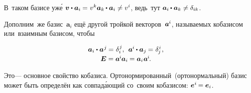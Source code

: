 \begin{otherlanguage}{russian}

\vspace{-0.16em}
В~таком базисе уж\'{е} ${\bm{v} \dotp \bm{a}_i \hspace{-0.1ex} = \hspace{.1ex} v^{k} \bm{a}_k \hspace{-0.1ex} \dotp \bm{a}_i \neq\vspace{.2ex} v^{i}}$\hspace{-0.25ex}, ведь~тут ${\bm{a}_i \hspace{-0.1ex} \dotp \bm{a}_k \neq\vspace{.2ex} \delta_{ik}}$.

Дополним~же \hbox{базис}~${\bm{a}_i}$ ещё другой тройкой векторов~\hbox{${\bm{a}^{\hspace{-0.05ex}i}}$\hspace{-0.25ex},} \hbox{называемых} кобазисом или~взаимным базисом, чтобы

\nopagebreak\vspace{-0.3em}\begin{equation}\label{fundamentalpropertyofcobasis}
\begin{array}{c}
\bm{a}_i \dotp \bm{a}^{\hspace{.1ex}j} \hspace{-0.1ex} = \hspace{.1ex} \delta_i^{\hspace{.1ex}j} , \:\:
\bm{a}^{\hspace{-0.05ex}i} \hspace{-0.1ex} \dotp \bm{a}_j \hspace{-0.1ex} = \hspace{.1ex} \delta_{\hspace{-0.1ex}j}^{\hspace{.1ex}i} \hspace{.16ex}, \\[0.2em]
\UnitDyad = \bm{a}^{\hspace{-0.1ex}i} \hspace{-0.1ex} \bm{a}_i \hspace{-0.1ex} = \bm{a}_i \hspace{.1ex} \bm{a}^{\hspace{-0.1ex}i}
\hspace{-0.2ex} .
\end{array}
\end{equation}

\vspace{-0.1em}\noindent Это\:--- основное свойство кобазиса. Орто\-нормирован\-ный~(орто\-нормаль\-ный) базис может быть определён как совпад\'{а}ющий со~своим кобазисом: ${\bm{e}^{\hspace{.05ex}i} \hspace{-0.2ex} = \bm{e}_{i}}$.


\end{otherlanguage}
